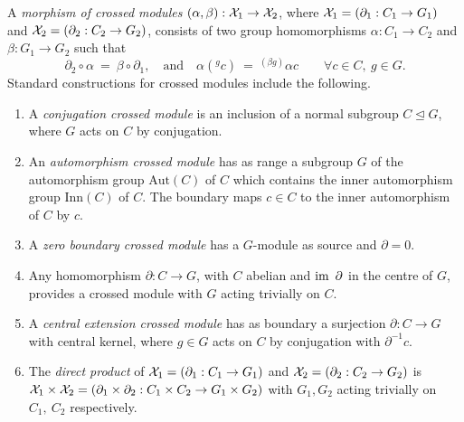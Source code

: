 \documentclass[a4paper,11pt]{article}
\theoremstyle{plain}
\theoremstyle{definition}
\begin{document}
A \emph{morphism of crossed modules} 
$(\alpha ,\beta ):\mathcal{X}_{1}\rightarrow \mathcal{X}_{2}$, 
where $\mathcal{X}_{1} = (\partial_{1} : C_{1} \rightarrow G_{1})$ 
and   $\mathcal{X}_{2} = (\partial_{2} : C_{2} \rightarrow G_{2})$, 
consists of two group homomorphisms $\alpha : C_{1}\rightarrow C_{2}$
and $\beta : G_{1}\rightarrow G_{2}$ such that 
$$ 
\partial_{2}\circ\alpha ~=~ \beta\circ\partial_{1}, 
\quad \mbox{and} \quad 
\alpha(^{g}c) ~=~ ^{(\beta g)}\alpha c 
\qquad
\forall c\in C,~ g\in G.
$$
Standard constructions for crossed modules include the following. 

\begin{enumerate}
	\item 
	A \emph{conjugation crossed module}  
	is an inclusion of a normal subgroup $C \unlhd G$, 
	where $G$ acts on $C$ by conjugation.
	\item 
	An \emph{automorphism crossed module}  
	has as range a subgroup $G$ of the automorphism group $\mbox{Aut}(C)$ of $C$ 
	which contains the inner automorphism group $\mbox{Inn}(C)$ of $C$. 
	The boundary maps $c \in C$ to the inner automorphism of $C$ by $c$.
	\item 
	A \emph{zero boundary crossed module}  
	has a $G$-module as source and $\partial = 0$.
	\item 
	Any homomorphism $\partial : C \to G$, with $C$ abelian 
	and $\mathrm{im}\, ~\partial$ in the centre of $G$, 
	provides a crossed module with $G$ acting trivially on $C$.
	\item 
	A \emph{central extension crossed module}  
	has as boundary a surjection $\partial : C \to G$ with central kernel, 
	where $g \in G$ acts on $C$ by conjugation with $\partial^{-1}c$.
	\item 
	The \emph{direct product} of  
	$\mathcal{X}_1 = (\partial_1 : C_1 \to G_1)$ and $\mathcal{X}_2 = (\partial_2 : C_2 \to G_2)$ 
	is $\mathcal{X}_1 \times \mathcal{X}_2 
	= (\partial_1 \times \partial_2 : C_1 \times C_2 \to G_1 \times G_2)$ 
	with $G_1, G_2$ acting trivially on $C_1,\ C_2$ respectively.
\end{enumerate}
\end{document}
